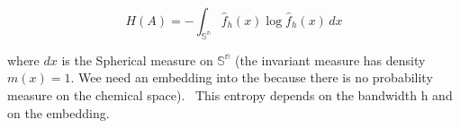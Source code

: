 \[ H(A) = -\int_\mathbb{{S}^n}  \hat{f}_h(x)\log  \hat{f}_h(x) \,dx  \]



where $dx$ is the Spherical measure on $\mathbb{{S}^n}$ (the invariant measure has density $m(x)=1$. Wee need an embedding into the because there is no probability measure on the chemical space). 
This entropy depends on the bandwidth h and on the embedding.
